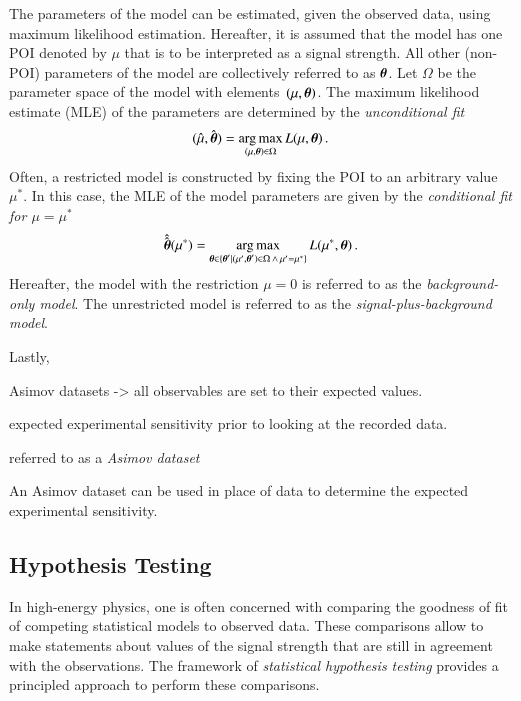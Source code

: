 The parameters of the model can be estimated, given the observed data, using
maximum likelihood estimation. Hereafter, it is assumed that the model has one
POI denoted by $\mu$ that is to be interpreted as a signal strength. All other
(non-POI) parameters of the model are collectively referred to as
$\myvec{\theta}$. Let $\Omega$ be the parameter space of the model with
elements~$(\mu, \myvec{\theta})$. The maximum likelihood estimate (MLE) of the
parameters are determined by the \emph{unconditional fit}
\begin{align}
  (\muhat, \hat{\myvec{\theta}}) = \argmax_{(\mu, \myvec{\theta}) \in \Omega} L(\mu, \myvec{\theta}) \,\text{.}
  \label{eq:unconditional_fit}
\end{align}
Often, a restricted model is constructed by fixing the POI to an arbitrary value
$\mu^*$. In this case, the MLE of the model parameters are given by the
\emph{conditional fit for $\mu = \mu^*$}
\begin{align}
  \hat{\hat{\myvec{\theta}}}(\mu^*) = \argmax_{\myvec{\theta} \in \{ \myvec{\theta}^\prime \mid (\mu^\prime, \myvec{\theta}^\prime) \in \Omega \,\land\, \mu^\prime = \mu^* \} } L(\mu^*, \myvec{\theta}) \,\text{.}
  \label{eq:conditional_fit}
\end{align}
Hereafter, the model with the restriction $\mu = 0$ is referred to as the
\emph{background-only model}. The unrestricted model is referred to as the
\emph{signal-plus-background model}.


Lastly,

Asimov datasets -> all observables are set to their expected values.

expected experimental sensitivity prior to looking at the recorded data.

referred to as a \emph{Asimov dataset}

An Asimov dataset can be used in place of data to determine the expected
experimental sensitivity.


\subsection{Hypothesis Testing}

In high-energy physics, one is often concerned with comparing the goodness of
fit of competing statistical models to observed data. These comparisons allow to
make statements about values of the signal strength that are still in agreement
with the observations. The framework of \emph{statistical hypothesis testing}
provides a principled approach to perform these comparisons.

